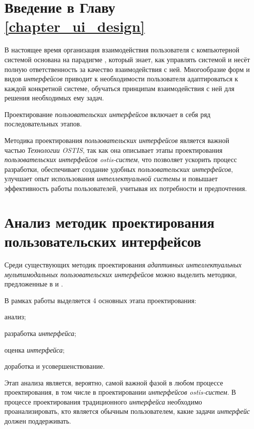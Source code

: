\section*{Введение в Главу \ref{chapter_ui_design}}

В настоящее время организация взаимодействия пользователя с компьютерной системой основана на парадигме , который знает, как управлять системой и несёт полную ответственность за качество взаимодействия с ней.
Многообразие форм и видов \textit{интерфейсов} приводит к необходимости пользователя  адаптироваться к каждой конкретной системе, обучаться принципам взаимодействия с ней для решения необходимых ему задач.

Проектирование \textit{пользовательских интерфейсов} включает в себя ряд последовательных этапов.

Методика проектирования \textit{пользовательских интерфейсов} является важной частью \textit{Технологии OSTIS}, так как она описывает этапы проектирования \textit{пользовательских интерфейсов ostis-систем}, что позволяет ускорить процесс разработки, обеспечивает создание удобных \textit{пользовательских интерфейсов}, улучшает опыт использования \textit{интеллектуальной системы} и повышает эффективность работы пользователей, учитывая их потребности и предпочтения.

\section{Анализ методик проектирования пользовательских интерфейсов}
\label{sec_analysis_UI_design_methodologies}

Среди существующих методик проектирования \textit{адаптивных интеллектуальных мультимодальных пользовательских интерфейсов} можно выделить методики, предложенные в  и  .

В рамках работы  выделяется 4 основных этапа проектирования:
\begin{textitemize}
    \item анализ;
    \item разработка \textit{интерфейса};
    \item оценка \textit{интерфейса};
    \item доработка и усовершенствование.
\end{textitemize}

Этап анализа является, вероятно, самой важной фазой в любом процессе проектирования, в том числе в проектировании \textit{интерфейсов ostis-систем}. В процессе проектирования традиционного \textit{интерфейса} необходимо проанализировать, кто является обычным пользователем, какие задачи \textit{интерфейс} должен поддерживать. 

